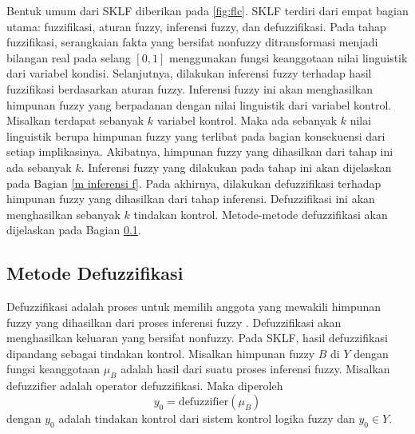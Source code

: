 \noindent Bentuk umum dari SKLF diberikan pada \ref{fig:flc}. SKLF terdiri dari empat bagian utama: fuzzifikasi, aturan fuzzy, inferensi fuzzy, dan defuzzifikasi. Pada tahap fuzzifikasi, serangkaian fakta yang bersifat nonfuzzy ditransformasi menjadi bilangan real pada selang $[0,1]$ menggunakan fungsi keanggotaan nilai linguistik dari variabel kondisi. Selanjutnya, dilakukan inferensi fuzzy terhadap hasil fuzzifikasi berdasarkan aturan fuzzy. Inferensi fuzzy ini akan menghasilkan himpunan fuzzy yang berpadanan dengan nilai linguistik dari variabel kontrol. Misalkan terdapat sebanyak $k$ variabel kontrol. Maka ada sebanyak $k$ nilai linguistik berupa himpunan fuzzy yang terlibat pada bagian konsekuensi dari setiap implikasinya. Akibatnya, himpunan fuzzy yang dihasilkan dari tahap ini ada sebanyak $k$. Inferensi fuzzy yang dilakukan pada tahap ini akan dijelaskan pada Bagian \ref{m inferensi f}. Pada akhirnya, dilakukan defuzzifikasi terhadap himpunan fuzzy yang dihasilkan dari tahap inferensi. Defuzzifikasi ini akan menghasilkan sebanyak $k$ tindakan kontrol. Metode-metode defuzzifikasi akan dijelaskan pada Bagian \ref{defuzz}.

\subsection{Metode Defuzzifikasi} \label{defuzz}
\noindent Defuzzifikasi adalah proses untuk memilih anggota yang mewakili himpunan fuzzy yang dihasilkan dari proses inferensi fuzzy \cite{fuller}. Defuzzifikasi akan menghasilkan keluaran yang bersifat nonfuzzy. Pada SKLF, hasil defuzzifikasi dipandang sebagai tindakan kontrol. Misalkan himpunan fuzzy $B$ di $Y$ dengan fungsi keanggotaan $\mu_B$ adalah hasil dari suatu proses inferensi fuzzy. Misalkan $\mathrm{defuzzifier}$ adalah operator defuzzifikasi. Maka diperoleh
\[ y_0 = \mathrm{defuzzifier}(\mu_B) \]
dengan $y_0$ adalah tindakan kontrol dari sistem kontrol logika fuzzy dan $y_0 \in Y$.

